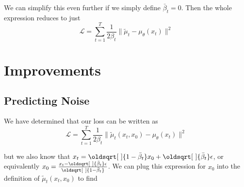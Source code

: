 \documentclass[11pt,dvipsnames]{article}
\renewcommand*{\sqrt}[2][\ ]{\oldsqrt[#1]{#2}}
\begin{document}
We can simplify this even further if we simply define $\bar\beta_t = 0$. Then the whole expression reduces to just
\begin{equation*}
\mathcal{L} = \sum_{t=1}^{T} \frac{1}{2\beta_t} \lVert \tilde\mu_t - \mu_\theta(x_t) \rVert^2
\end{equation*}

\section{Improvements}
\subsection{Predicting Noise}
We have determined that our loss can be written as
\begin{equation*}
\mathcal{L} = \sum_{t=1}^{T} \frac{1}{2\beta_t} \lVert \tilde\mu_t(x_t, x_0) - \mu_\theta(x_t) \rVert^2
\end{equation*}

but we also know that $x_t = \sqrt{1 - \bar\beta_t} x_0 + \sqrt{\bar\beta_t} \epsilon$, or equivalently
$x_0 = \frac{x_t - \sqrt{\bar\beta_t}\epsilon}{\sqrt{1 - \bar\beta_t}}$. We can plug this expression
for $x_0$ into the definition of $\tilde\mu_t(x_t, x_0)$ to find
\end{document}
